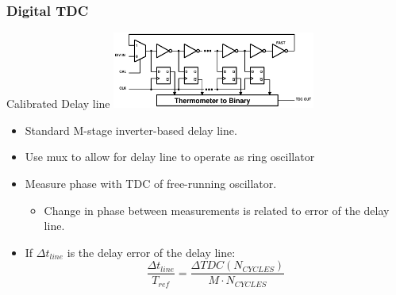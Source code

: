 \documentclass[t, screen, aspectratio=43]{beamer}
\begin{document}
\begin{frame}
	\frametitle{Digital TDC}
	\begin{block}{Calibrated Delay line}
			\vspace{-0.5em}
			\center\includegraphics[width=0.5\textwidth, angle=0]{tdc_cal.pdf}	
		\begin{itemize}
			\scriptsize
			\item Standard M-stage inverter-based delay line.
			\item Use mux to allow for delay line to operate as ring oscillator
			\item Measure phase with TDC of free-running oscillator.
			\begin{itemize}
				\scriptsize
				\item Change in phase between measurements is related to error of the delay line.
			\end{itemize}
			\item If $\Delta t_{line}$ is the delay error of the delay line:
			\tiny
			\begin{equation}
				\frac{\Delta t_{line}}{T_{ref}} = \frac{\Delta TDC(N_{CYCLES})}{M\cdot N_{CYCLES}}
			\end{equation}
			\scriptsize	
		\end{itemize}

	\end{block}
\end{frame}
\end{document}
